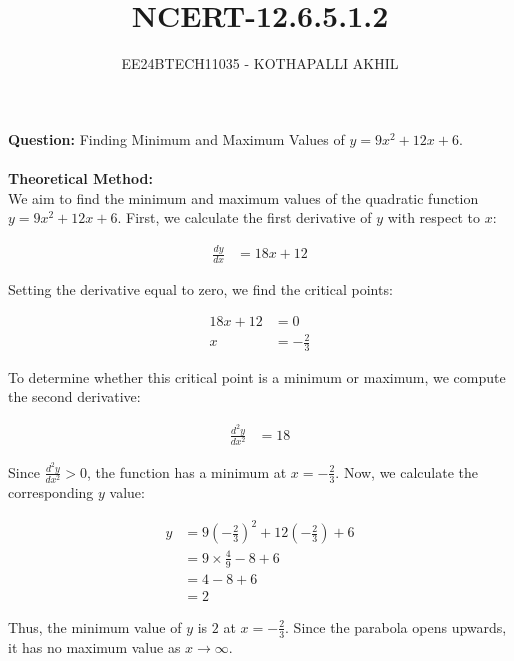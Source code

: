 \documentclass[article]{IEEEtran}
\numberwithin{figure}{enumi}
\begin{document}

\title{NCERT-12.6.5.1.2}
\author{EE24BTECH11035 - KOTHAPALLI AKHIL}
{\let\newpage\relax\maketitle}
\noindent\textbf{Question: }  
Finding Minimum and Maximum Values of $y = 9x^2 + 12x + 6$.\\
\solution \\
\textbf{Theoretical Method:}\\
We aim to find the minimum and maximum values of the quadratic function $y = 9x^2 + 12x + 6$. First, we calculate the first derivative of $y$ with respect to $x$:

\begin{align}
\frac{dy}{dx} &= 18x + 12
\end{align}

Setting the derivative equal to zero, we find the critical points:

\begin{align}
18x + 12 &= 0 \\
x &= -\frac{2}{3}
\end{align}

To determine whether this critical point is a minimum or maximum, we compute the second derivative:

\begin{align}
\frac{d^2y}{dx^2} &= 18
\end{align}

Since $\frac{d^2y}{dx^2} > 0$, the function has a minimum at $x = -\frac{2}{3}$. Now, we calculate the corresponding $y$ value:

\begin{align}
y &= 9\left(-\frac{2}{3}\right)^2 + 12\left(-\frac{2}{3}\right) + 6 \\
&= 9 \times \frac{4}{9} - 8 + 6 \\
&= 4 - 8 + 6 \\
&= 2
\end{align}

Thus, the minimum value of $y$ is $2$ at $x = -\frac{2}{3}$. Since the parabola opens upwards, it has no maximum value as $x \to \infty$.
\end{document}
